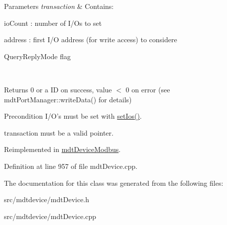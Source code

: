 \begin{DoxyParams}{Parameters}
{\em transaction} & Contains:
\begin{DoxyItemize}
\item ioCount : number of I/Os to set
\item address : first I/O address (for write access) to considere
\item QueryReplyMode flag 
\end{DoxyItemize}\\
\hline
\end{DoxyParams}
\begin{DoxyReturn}{Returns}
0 or a ID on success, value $<$ 0 on error (see mdtPortManager::writeData() for details) 
\end{DoxyReturn}
\begin{DoxyPrecond}{Precondition}
I/O's must be set with \hyperlink{classmdt_device_a9f1de62ef54974b0636dee673bd819e2}{setIos()}. 

transaction must be a valid pointer. 
\end{DoxyPrecond}


Reimplemented in \hyperlink{classmdt_device_modbus_aad3ce85a19307e3056b940da99fe512b}{mdtDeviceModbus}.



Definition at line 957 of file mdtDevice.cpp.



The documentation for this class was generated from the following files:\begin{DoxyCompactItemize}
\item 
src/mdtdevice/mdtDevice.h\item 
src/mdtdevice/mdtDevice.cpp\end{DoxyCompactItemize}
